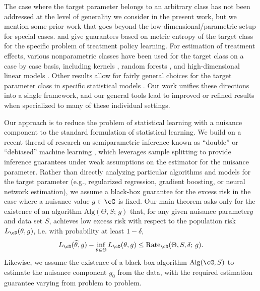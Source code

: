 \documentclass[11pt]{article} %
\theoremstyle{theorem}  %
\theoremstyle{plain}
\newcommand{\wh}[1]{\widehat{#1}}
\newcommand{\midsem}{;\,}
\newcommand{\poprisk}{L_{\cD}}
\newcommand{\esttwo}{\wh{\theta}}
\newcommand{\nuisance}{\cG}
\newcommand{\target}{\Theta}
\newcommand{\Rate}{\mathrm{Rate}_{\cD}}
\newcommand{\gtone}{g_0}
\newcommand{\param}{parameter\xspace}
\begin{document}
%

%
%

%

%
%
%
%

The case where the target parameter belongs to an arbitrary class has not been addressed at the level of generality we consider in the present work, but we mention some prior work that goes beyond the low-dimensional/parametric setup for special cases. \cite{athey2017efficient} and \cite{zhou2018offline} give guarantees based on metric entropy of the target class for the specific problem of treatment policy learning. For estimation of treatment effects, various nonparametric classes have been used for the target class on a case by case basis, including kernels \citep{nie2017quasi}, random forests \citep{athey2016generalized, oprescu2018orthogonal,friedberg2018}, and high-dimensional linear models \citep{chernozhukov2017orthogonal,chernozhukov2018plugin}. Other results allow for fairly general choices for the target parameter class in specific statistical models \citep{rubin2005general,rubin2007doubly,diaz2013targeted,van2014targeted,kennedy2017non,kennedy2019robust,kunzel2017meta}. Our work unifies these directions into a single framework, and our general tools lead to improved or refined results when specialized to many of these individual settings.

%
%


Our approach is to reduce the problem of statistical learning with a nuisance component to the standard formulation of statistical learning. We build on a recent thread of research on semiparametric inference known as ``double'' or ``debiased'' machine learning %
\citep{chernozhukov2016locally,chernozhukov2017orthogonal,chernozhukov2016double,chernozhukov2018double,chernozhukov2018plugin}, which leverages sample splitting to provide inference guarantees under weak assumptions on the estimator for the nuisance parameter. Rather than directly analyzing particular algorithms and models for the target parameter (e.g., regularized regression, gradient boosting, or neural network estimation), we assume a black-box guarantee for the excess risk in the case where a nuisance value $g\in\nuisance$ is fixed. Our main theorem asks only for the existence of an algorithm $\mathrm{Alg}(\target, S \midsem g)$ that, for any given nuisance \param $g$ and data set $S$, achieves low excess risk with respect to the population risk $L_{\cD}(\theta, g)$, i.e. with probability at least $1-\delta$,
\begin{equation}
\poprisk(\esttwo,g) - \inf_{\theta\in\target}\poprisk(\theta,g) \leq \Rate(\target,  S, \delta\midsem{}g).
\end{equation}
Likewise, we assume the existence of a black-box algorithm $\mathrm{Alg}(\nuisance,S)$ to estimate the nuisance component $\gtone$ from the data, with the required estimation guarantee varying from problem to problem.
\end{document}
